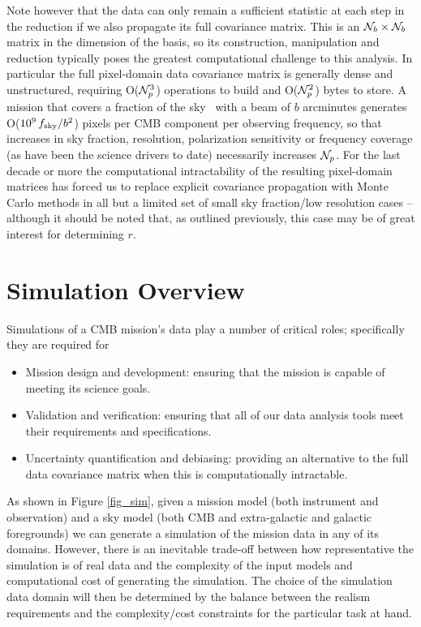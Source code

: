 Note however that the data can only remain a sufficient statistic at each step in the reduction if we also propagate its full covariance matrix. This is an ${\cal N}_b \times {\cal N}_b$ matrix in the dimension of the basis, so its construction, manipulation and reduction typically poses the greatest computational challenge to this analysis. In particular the full pixel-domain data covariance matrix is generally dense and unstructured, requiring O(${\cal N}_p^3$) operations to build and O(${\cal N}_p^2$) bytes to store. A mission that covers a fraction of the sky \fsky\ with a beam of $b$ arcminutes generates O($10^9 \, f_\mathrm{sky}/b^2$) pixels per CMB component per observing frequency, so that increases in sky fraction, resolution, polarization sensitivity or frequency coverage (as have been the science drivers to date) necessarily increases ${\cal N}_p$. For the last decade or more the computational intractability of the resulting pixel-domain matrices has forced us to replace explicit covariance propagation with Monte Carlo methods in all but a limited set of small sky fraction/low resolution cases -- although it should be noted that, as outlined previously, this case may be of great interest for determining $r$.







\section{Simulation Overview}
Simulations of a CMB mission's data play a number of critical roles; specifically they are required for
\begin{itemize}
\item Mission design and development: ensuring that the mission is capable of meeting its science goals.
\item Validation and verification: ensuring that all of our data analysis tools meet their requirements and specifications.
\item Uncertainty quantification and debiasing: providing an alternative to the full data covariance matrix when this is computationally intractable.
\end{itemize}

As shown in Figure \ref{fig_sim}, given a mission model (both instrument and observation) and a sky model (both CMB and extra-galactic and galactic foregrounds) we can generate a simulation of the mission data in any of its domains. However, there is an inevitable trade-off between how representative the simulation is of real data and the complexity of the input models and computational cost of generating the simulation. The choice of the simulation data domain will then be determined by the balance between the realism requirements and the complexity/cost constraints for the particular task at hand.

